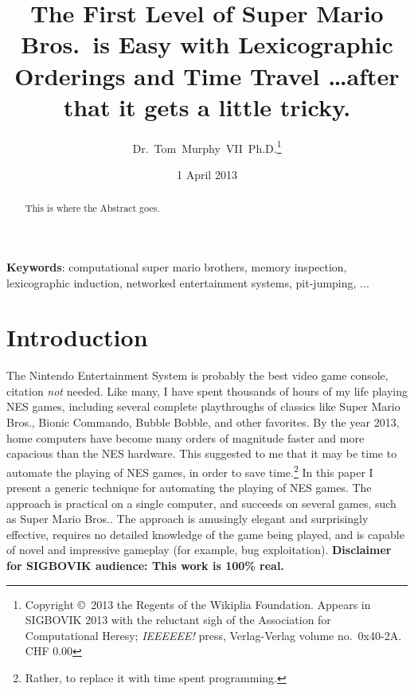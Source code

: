 \documentclass[twocolumn]{article}
\begin{document}
 

\title{The First Level of Super Mario Bros.~is Easy with
       Lexicographic Orderings and Time Travel
       {\normalsize \ldots after that it gets a little tricky.}}
\author{Dr.~Tom~Murphy~VII~Ph.D.\thanks{
Copyright \copyright\ 2013 the Regents of the Wikiplia
Foundation. Appears in SIGBOVIK 2013 with the reluctant sigh of the
Association for Computational Heresy; {\em IEEEEEE!} press,
Verlag-Verlag volume no.~0x40-2A.
CHF 0.00}
}

\renewcommand\>{$>$}
\newcommand\<{$<$}

\date{1 April 2013}

\maketitle

\begin{abstract}
This is where the Abstract goes.
\end{abstract}

\vspace{1em}
{\noindent \small {\bf Keywords}:
  computational super mario brothers, memory inspection, lexicographic induction, networked entertainment systems, pit-jumping, ...

}

\section{Introduction}
The Nintendo Entertainment System is probably the best video game console, citation {\it not} needed. Like many, I have spent thousands of hours of my life playing NES games, including several complete playthroughs of classics like Super Mario Bros., Bionic Commando, Bubble Bobble, and other favorites. By the year 2013, home computers have become many orders of magnitude faster and more capacious than the NES hardware. This suggested to me that it may be time to automate the playing of NES games, in order to save time.\footnote{Rather, to replace it with time spent programming.} In this paper I present a generic technique for automating the playing of NES games. The approach is practical on a single computer, and succeeds on several games, such as Super Mario Bros.. The approach is amusingly elegant and surprisingly effective, requires no detailed knowledge of the game being played, and is capable of novel and impressive gameplay (for example, bug exploitation). {\bf Disclaimer for SIGBOVIK audience: This work is 100\% real.}
\end{document}
